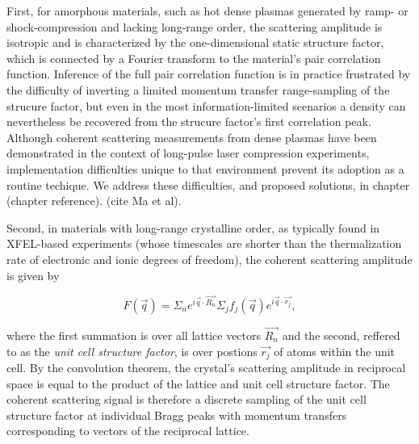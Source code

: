 First, for amorphous materials, such as hot dense plasmas generated by ramp- or shock-compression and lacking long-range order, the scattering amplitude is isotropic and is characterized by the one-dimensional static structure factor, which is connected by a Fourier transform to the material's pair correlation function. Inference of the full pair correlation function is in practice frustrated by the difficulty of inverting a limited momentum transfer range-sampling of the strucure factor, but even in the most information-limited scenarios a density can nevertheless be recovered from the strucure factor's first correlation peak. Although coherent scattering measurements from dense plasmas have been demonstrated in the context of long-pulse laser compression experiments, implementation difficulties unique to that environment prevent its adoption as a routine techique. We address these difficulties, and proposed solutions, in chapter (chapter reference). (cite Ma et al).

Second, in materials with long-range crystalline order, as typically found in XFEL-based experiments (whose timescales are shorter than the thermalization rate of electronic and ionic degrees of freedom), the coherent scattering amplitude is given by

\begin{equation}
F(\vec{q}) = \Sigma_n e^{i \vec{q} \cdot \vec{R_n}} \Sigma_j f_j(\vec{q}) e^{i \vec{q} \cdot \vec{r_j}},
\end{equation}

where the first summation is over all lattice vectors $\vec{R_n}$ and the second, reffered to as the \emph{unit cell structure factor}, is over postions $\vec{r_j}$ of atoms within the unit cell. By the convolution theorem, the crystal's scattering amplitude in reciprocal space is equal to the product of the lattice and unit cell structure factor. The coherent scattering signal is therefore a discrete sampling of the unit cell structure factor at individual Bragg peaks with momentum transfers corresponding to vectors of the reciprocal lattice.


